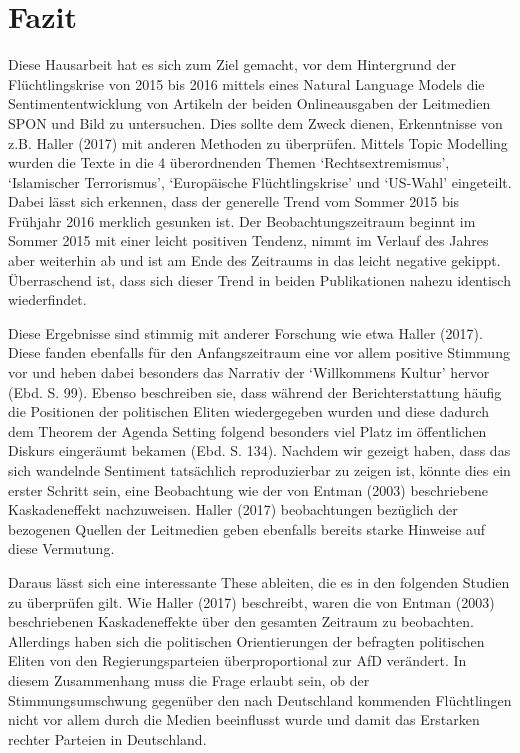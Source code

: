 \documentclass[
  11pt,
]{article}
\begin{document}
\hypertarget{fazit}{%
\section{Fazit}\label{fazit}}

Diese Hausarbeit hat es sich zum Ziel gemacht, vor dem Hintergrund der
Flüchtlingskrise von 2015 bis 2016 mittels eines Natural Language Models
die Sentimententwicklung von Artikeln der beiden Onlineausgaben der
Leitmedien SPON und Bild zu untersuchen. Dies sollte dem Zweck dienen,
Erkenntnisse von z.B. Haller (2017) mit anderen Methoden zu überprüfen.
Mittels Topic Modelling wurden die Texte in die 4 überordnenden Themen
`Rechtsextremismus', `Islamischer Terrorismus', `Europäische
Flüchtlingskrise' und `US-Wahl' eingeteilt. Dabei lässt sich erkennen,
dass der generelle Trend vom Sommer 2015 bis Frühjahr 2016 merklich
gesunken ist. Der Beobachtungszeitraum beginnt im Sommer 2015 mit einer
leicht positiven Tendenz, nimmt im Verlauf des Jahres aber weiterhin ab
und ist am Ende des Zeitraums in das leicht negative gekippt.
Überraschend ist, dass sich dieser Trend in beiden Publikationen nahezu
identisch wiederfindet.

Diese Ergebnisse sind stimmig mit anderer Forschung wie etwa Haller
(2017). Diese fanden ebenfalls für den Anfangszeitraum eine vor allem
positive Stimmung vor und heben dabei besonders das Narrativ der
`Willkommens Kultur' hervor (Ebd. S. 99). Ebenso beschreiben sie, dass
während der Berichterstattung häufig die Positionen der politischen
Eliten wiedergegeben wurden und diese dadurch dem Theorem der Agenda
Setting folgend besonders viel Platz im öffentlichen Diskurs eingeräumt
bekamen (Ebd. S. 134). Nachdem wir gezeigt haben, dass das sich
wandelnde Sentiment tatsächlich reproduzierbar zu zeigen ist, könnte
dies ein erster Schritt sein, eine Beobachtung wie der von Entman (2003)
beschriebene Kaskadeneffekt nachzuweisen. Haller (2017) beobachtungen
bezüglich der bezogenen Quellen der Leitmedien geben ebenfalls bereits
starke Hinweise auf diese Vermutung.

Daraus lässt sich eine interessante These ableiten, die es in den
folgenden Studien zu überprüfen gilt. Wie Haller (2017) beschreibt,
waren die von Entman (2003) beschriebenen Kaskadeneffekte über den
gesamten Zeitraum zu beobachten. Allerdings haben sich die politischen
Orientierungen der befragten politischen Eliten von den
Regierungsparteien überproportional zur AfD verändert. In diesem
Zusammenhang muss die Frage erlaubt sein, ob der Stimmungsumschwung
gegenüber den nach Deutschland kommenden Flüchtlingen nicht vor allem
durch die Medien beeinflusst wurde und damit das Erstarken rechter
Parteien in Deutschland.
\end{document}
